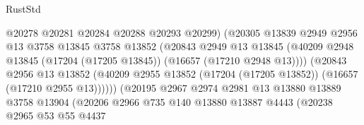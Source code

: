 \begin{lexlean}{RustStd}
\begin{coremodule}
                                        @20278
                                        @20281
                                        @20284
                                        @20288
                                        @20293
                                        @20299)
                                      (@20305
                                        @13839
                                        @2949
                                        @2956
                                        @13
                                        @3758
                                        @13845
                                        @3758
                                        @13852
                                        (@20843
                                          @2949
                                          @13
                                          @13845
                                          (@40209
                                            @2948
                                            @13845
                                            (@17204 (@17205 @13845))
                                            (@16657 (@17210 @2948 @13))))
                                        (@20843
                                          @2956
                                          @13
                                          @13852
                                          (@40209
                                            @2955
                                            @13852
                                            (@17204 (@17205 @13852))
                                            (@16657 (@17210 @2955 @13))))))
                                    (@20195
                                      @2967
                                      @2974
                                      @2981
                                      @13
                                      @13880
                                      @13889
                                      @3758
                                      @13904
                                      (@20206
                                        @2966
                                        @735
                                        @140
                                        @13880
                                        @13887
                                        @4443
                                        (@20238
                                          @2965
                                          @53
                                          @55
                                          @4437

\end{coremodule}
\end{lexlean}
